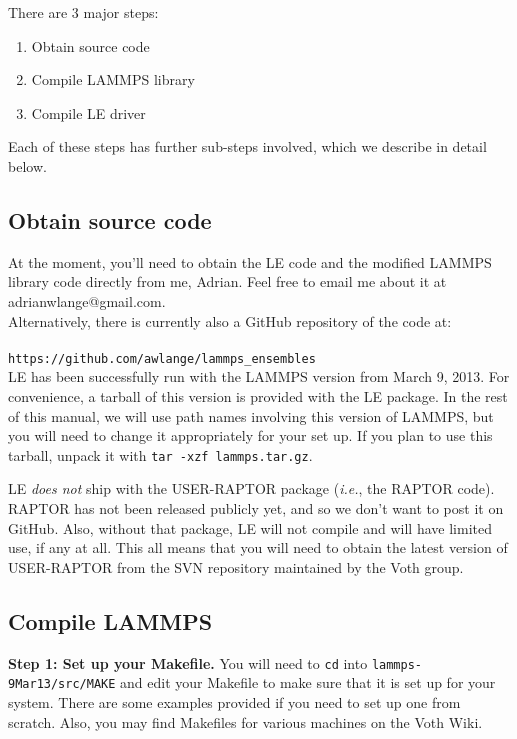 \documentclass[10pt]{article}
\begin{document}
There are 3 major steps:
\begin{enumerate}
	\item Obtain source code
	\item Compile LAMMPS library
	\item Compile LE driver
\end{enumerate}
Each of these steps has further sub-steps involved, which we describe in detail below.

\subsection{Obtain source code}

At the moment, you'll need to obtain the LE code and the modified LAMMPS
library code directly from me, Adrian. Feel free to email me about it at adrianwlange@gmail.com.\\

\noindent Alternatively, there is currently also a GitHub repository of the code at:\\
\\
\texttt{https://github.com/awlange/lammps\_ensembles}\\

LE has been successfully run with the LAMMPS version from
March 9, 2013. For convenience, a tarball of this version is provided with the LE package.
In the rest of this manual, we will use path names involving this version of LAMMPS, but
you will need to change it appropriately for your set up. If you plan to use this tarball,
unpack it with \texttt{tar -xzf lammps.tar.gz}.

LE {\em does not} ship with the USER-RAPTOR package ({\em i.e.}, the RAPTOR code). RAPTOR has
not been released publicly yet, and so we don't want to post it on GitHub. Also, without that
package, LE will not compile and will have limited use, if any at all. This all means that
you will need to obtain the latest version of USER-RAPTOR from the SVN repository maintained
by the Voth group.


\subsection{Compile LAMMPS}\label{sec:LAMMPS}

\textbf{Step 1: Set up your Makefile.}
You will need to \texttt{cd} into \texttt{lammps-9Mar13/src/MAKE} and edit your Makefile to 
make sure that it is set up for your system. There are some examples provided if you need
to set up one from scratch. Also, you may find Makefiles for various machines on the Voth Wiki.
\end{document}
